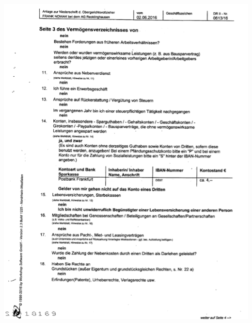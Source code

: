 \bigskip\noindent
\begin{minipage}{\textwidth}
  \centering
  \includegraphics{img/VVformular_teil3.PNG}
\end{minipage}

